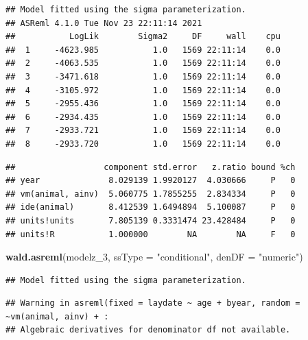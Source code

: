 \documentclass[
  12pt,
]{book}
\newenvironment{Shaded}{\begin{snugshade}}{\end{snugshade}}
\newcommand{\DataTypeTok}[1]{\textcolor[rgb]{0.13,0.29,0.53}{#1}}
\newcommand{\DecValTok}[1]{\textcolor[rgb]{0.00,0.00,0.81}{#1}}
\newcommand{\KeywordTok}[1]{\textcolor[rgb]{0.13,0.29,0.53}{\textbf{#1}}}
\newcommand{\NormalTok}[1]{#1}
\newcommand{\OperatorTok}[1]{\textcolor[rgb]{0.81,0.36,0.00}{\textbf{#1}}}
\newcommand{\StringTok}[1]{\textcolor[rgb]{0.31,0.60,0.02}{#1}}
\begin{document}
\begin{verbatim}
## Model fitted using the sigma parameterization.
## ASReml 4.1.0 Tue Nov 23 22:11:14 2021
##           LogLik        Sigma2     DF     wall    cpu
##  1     -4623.985           1.0   1569 22:11:14    0.0
##  2     -4063.535           1.0   1569 22:11:14    0.0
##  3     -3471.618           1.0   1569 22:11:14    0.0
##  4     -3105.972           1.0   1569 22:11:14    0.0
##  5     -2955.436           1.0   1569 22:11:14    0.0
##  6     -2934.435           1.0   1569 22:11:14    0.0
##  7     -2933.721           1.0   1569 22:11:14    0.0
##  8     -2933.720           1.0   1569 22:11:14    0.0
\end{verbatim}

\begin{Shaded}
\end{Shaded}

\begin{verbatim}
##                  component std.error   z.ratio bound %ch
## year              8.029139 1.9920127  4.030666     P   0
## vm(animal, ainv)  5.060775 1.7855255  2.834334     P   0
## ide(animal)       8.412539 1.6494894  5.100087     P   0
## units!units       7.805139 0.3331474 23.428484     P   0
## units!R           1.000000        NA        NA     F   0
\end{verbatim}

\begin{Shaded}
\begin{Highlighting}[]
\KeywordTok{wald.asreml}\NormalTok{(modelz\_}\DecValTok{3}\NormalTok{, }\DataTypeTok{ssType =} \StringTok{"conditional"}\NormalTok{, }\DataTypeTok{denDF =} \StringTok{"numeric"}\NormalTok{)}
\end{Highlighting}
\end{Shaded}

\begin{verbatim}
## Model fitted using the sigma parameterization.
\end{verbatim}

\begin{verbatim}
## Warning in asreml(fixed = laydate ~ age + byear, random = ~vm(animal, ainv) + :
## Algebraic derivatives for denominator df not available.
\end{verbatim}
\end{document}
